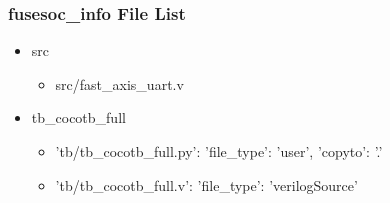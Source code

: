 \subsubsection{fusesoc\_info File List}
\begin{itemize}
\item src
	\begin{itemize}
	\item src/fast\_axis\_uart.v
	\end{itemize}
\item tb\_cocotb\_full
	\begin{itemize}
	\item {'tb/tb\_cocotb\_full.py': {'file\_type': 'user', 'copyto': '.'}}
	\item {'tb/tb\_cocotb\_full.v': {'file\_type': 'verilogSource'}}
	\end{itemize}
\end{itemize}
